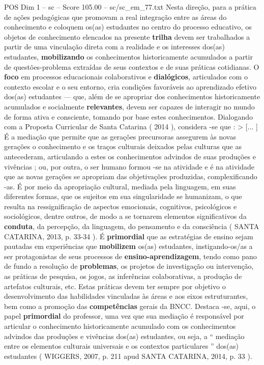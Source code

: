\begin{textsample}{POS Dim 1 – sc – Score 105.00 – sc/sc\_em\_77.txt}
Nesta direção, para a prática de ações pedagógicas que promovam a real integração entre as áreas do conhecimento e coloquem os(as) estudantes no centro do processo educativo, os objetos de conhecimento elencados na presente \textbf{trilha} devem ser trabalhados a partir de uma vinculação direta com a realidade e os interesses dos(as) estudantes, \textbf{mobilizando} os conhecimentos historicamente acumulados a partir de questões-problema extraídas de seus contextos e de suas práticas cotidianas.
O \textbf{foco} em processos educacionais colaborativos e \textbf{dialógicos}, articulados com o contexto escolar e o seu entorno, cria condições favoráveis ao aprendizado efetivo dos(as) estudantes — que, além de se apropriar dos conhecimentos historicamente acumulados e socialmente \textbf{relevantes}, devem ser capazes de interagir no mundo de forma ativa e consciente, tomando por base estes conhecimentos.
Dialogando com a Proposta Curricular de Santa Catarina ( 2014 ), considera -se que : > [... ] É a mediação que permite que as gerações precursoras assegurem às novas gerações o conhecimento e os traços culturais deixados pelas culturas que as antecederam, articulando a estes os conhecimentos advindos de suas produções e vivências ; ou, por outra, o ser humano formou -se na atividade e é na atividade que as novas gerações se apropriam das objetivações produzidas, complexificando -as.
É por meio da apropriação cultural, mediada pela linguagem, em suas diferentes formas, que os sujeitos em sua singularidade se humanizam, o que resulta na ressignificação de aspectos emocionais, cognitivos, psicológicos e sociológicos, dentre outros, de modo a se tornarem elementos significativos da \textbf{conduta}, da percepção, da linguagem, do pensamento e da consciência ( SANTA CATARINA, 2013, p. 33-34 ).
É \textbf{primordial} que as estratégias de ensino sejam pautadas em experiências que \textbf{mobilizem} os(as) estudantes, instigando-os/as a ser protagonistas de seus processos de \textbf{ensino-aprendizagem}, tendo como pano de fundo a resolução de \textbf{problemas}, os projetos de investigação ou intervenção, as práticas de pesquisa, os jogos, as inferências colaborativas, a produção de artefatos culturais, etc.
Estas práticas devem ter sempre por objetivo o desenvolvimento das habilidades vinculadas às áreas e aos eixos estruturantes, bem como a promoção das \textbf{competências} gerais da BNCC.
Destaca -se, aqui, o papel \textbf{primordial} do professor, uma vez que sua mediação é responsável por articular o conhecimento historicamente acumulado com os conhecimentos advindos das produções e vivências dos(as) estudantes, ou seja, a “ mediação entre os elementos culturais universais e os contextos particulares ” dos(as) estudantes ( WIGGERS, 2007, p. 211 apud SANTA CATARINA, 2014, p. 33 ).

\end{textsample}
